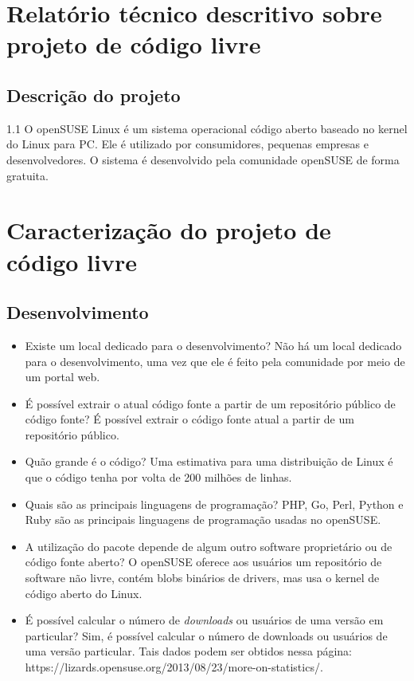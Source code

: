 \documentclass[12pt,a4paper]{article} %
\newcommand\BackgroundStructure{ %
\setlength{\unitlength}{1mm} %

\setlength\fboxsep{0mm} %
\setlength\fboxrule{0.5mm} %
\put(10, 20pr){\fcolorbox{black}{gray!5}{\framebox(155,247){}}} %
\put(165, 20){\fcolorbox{black}{gray!10}{\framebox(37,247){}}} %
\put(10, 262){\fcolorbox{black}{white!10}{\framebox(192, 25){}}} %
\put(175, 263){\texttt{[image: ]}} %
}
\begin{document}


\section{Relat\'orio t\'ecnico descritivo sobre projeto de c\'odigo livre} 

\subsection{Descrição do projeto}
1.1	O openSUSE Linux é um sistema operacional código aberto baseado no kernel do Linux para PC. Ele é utilizado por consumidores, pequenas empresas e desenvolvedores. O sistema é desenvolvido pela comunidade openSUSE de forma gratuita.



\section{Caracterização do projeto de código livre} 


\subsection{Desenvolvimento}


\begin{itemize}
\item Existe um local dedicado para o desenvolvimento?
Não há um local dedicado para o desenvolvimento, uma vez que ele é feito pela comunidade por meio de um portal web.
\item É possível extrair o atual código fonte a partir de um repositório público de código fonte?
É possível extrair o código fonte atual a partir de um repositório público.
\item Quão grande é o código?
Uma estimativa para uma distribuição de Linux é que o código tenha por volta de 200 milhões de linhas.
\item Quais são as principais linguagens de programação?
PHP, Go, Perl, Python e Ruby são as principais linguagens de programação usadas no openSUSE.
\item A utilização do pacote depende de algum outro software proprietário ou de código fonte aberto?
O openSUSE oferece aos usuários um repositório de software não livre, contém blobs binários de drivers, mas usa o kernel de código aberto do Linux.
\item É possível calcular o número de \textit{downloads} ou usuários de uma versão em particular?
Sim, é possível calcular o número de downloads ou usuários de uma versão particular. Tais dados podem ser obtidos nessa página: https://lizards.opensuse.org/2013/08/23/more-on-statistics/.
\end{itemize}
\end{document}
